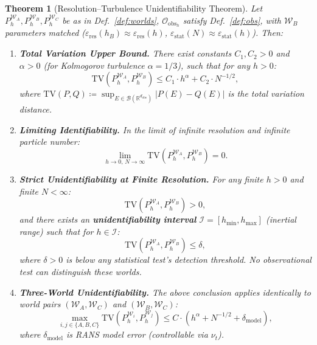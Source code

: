 \documentclass[11pt,a4paper]{article}
\newtheorem{theorem}{Theorem}[section]
\theoremstyle{definition}
\theoremstyle{remark}
\newcommand{\R}{\mathbb{R}}
\newcommand{\TV}{\mathrm{TV}}
\newcommand{\abs}[1]{\left\lvert#1\right\rvert}
\newcommand{\Obs}{\mathcal{O}_{\text{obs}}}
\newcommand{\epsRes}{\varepsilon_{\text{res}}}
\newcommand{\epsStat}{\varepsilon_{\text{stat}}}
\begin{document}
\begin{theorem}[Resolution--Turbulence Unidentifiability Theorem]
\label{thm:unidentifiability}
Let $P_h^{\mathcal{W}_A}, P_h^{\mathcal{W}_B}, P_h^{\mathcal{W}_C}$ be as in Def.~\ref{def:worlds}, $\Obs_h$ satisfy Def.~\ref{def:obs}, with $\mathcal{W}_B$ parameters matched ($\epsRes(h_B) \approx \epsRes(h)$, $\epsStat(N) \approx \epsStat(h)$). Then:

\begin{enumerate}[label=(\roman*),leftmargin=*]
  \item \textbf{Total Variation Upper Bound.} There exist constants $C_1, C_2 > 0$ and $\alpha > 0$ (for Kolmogorov turbulence $\alpha = 1/3$), such that for any $h > 0$:
  \begin{equation}\label{eq:tv_bound}
    \TV(P_h^{\mathcal{W}_A}, P_h^{\mathcal{W}_B})
    \leq C_1 \cdot h^{\alpha} + C_2 \cdot N^{-1/2},
  \end{equation}
  where $\TV(P, Q) \coloneqq \sup_{E \in \mathscr{B}(\R^{d_{\text{obs}}})} \abs{P(E) - Q(E)}$ is the total variation distance.

  \item \textbf{Limiting Identifiability.} In the limit of infinite resolution and infinite particle number:
  \begin{equation}\label{eq:tv_limit}
    \lim_{h \to 0,\, N \to \infty} \TV(P_h^{\mathcal{W}_A}, P_h^{\mathcal{W}_B}) = 0.
  \end{equation}

  \item \textbf{Strict Unidentifiability at Finite Resolution.} For any finite $h > 0$ and finite $N < \infty$:
  \begin{equation}\label{eq:tv_strict}
    \TV(P_h^{\mathcal{W}_A}, P_h^{\mathcal{W}_B}) > 0,
  \end{equation}
  and there exists an \textbf{unidentifiability interval} $\mathcal{I} = [h_{\min}, h_{\max}]$ (inertial range) such that for $h \in \mathcal{I}$:
  \begin{equation}\label{eq:tv_unidentifiable}
    \TV(P_h^{\mathcal{W}_A}, P_h^{\mathcal{W}_B}) \leq \delta,
  \end{equation}
  where $\delta > 0$ is below any statistical test's detection threshold. No observational test can distinguish these worlds.

  \item \textbf{Three-World Unidentifiability.} The above conclusion applies identically to world pairs $(\mathcal{W}_A, \mathcal{W}_C)$ and $(\mathcal{W}_B, \mathcal{W}_C)$:
  \begin{equation}\label{eq:three_world_tv}
    \max_{i,j \in \{A,B,C\}} \TV(P_h^{\mathcal{W}_i}, P_h^{\mathcal{W}_j})
    \leq C \cdot (h^{\alpha} + N^{-1/2} + \delta_{\text{model}}),
  \end{equation}
  where $\delta_{\text{model}}$ is RANS model error (controllable via $\nu_t$).
\end{enumerate}
\end{theorem}
\end{document}
